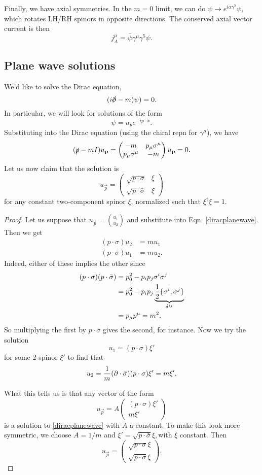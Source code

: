 Finally, we have axial symmetries. In the $m=0$ limit, we can do $\psi \to e^{i\alpha \gamma^5} \psi$, which rotates LH/RH spinors in opposite directions. The conserved axial vector current is then
$$j^\mu_A =\bar \psi \gamma^\mu \gamma^5 \psi.$$

\subsection*{Plane wave solutions} We'd like to solve the Dirac equation,
$$(i\slashed{\p}-m)\psi)=0.$$
In particular, we will look for solutions of the form
$$\psi = u_p e^{-ip\cdot x}.$$
Substituting into the Dirac equation (using the chiral repn for $\gamma^\mu$), we have
\begin{equation}\label{diracplanewave}
(\slashed{p}-m I)u_{\vec p} = \begin{pmatrix} -m & p_\mu \sigma^\mu \\
p_\mu \bar \sigma^\mu & -m
\end{pmatrix} u_{\vec p} =0.
\end{equation}
Let us now claim that the solution is
$$u_{\vec p}=\begin{pmatrix}
    \sqrt{p\cdot \sigma} & \xi\\
    \sqrt{p\cdot \bar \sigma} & \xi
\end{pmatrix}$$
for any constant two-component spinor $\xi$, normalized such that $\xi^\dagger \xi =1$.
\begin{proof}
Let us suppose that $u_{\vec p}={u_1\choose u_2}$ and substitute into Eqn. \ref{diracplanewave}. Then we get
\begin{align}
    (p\cdot \sigma)u_2 &= m u_1\\
    (p\cdot \bar \sigma)u_1 &= m u_2.
\end{align}
Indeed, either of these implies the other since
\begin{align*}
    (p\cdot \sigma)(p\cdot \bar \sigma) &= p_0^2 -p_i p_j \sigma^i \sigma^j\\
    &= p_0^2 -p_i p_j \underbrace{\frac{1}{2}\set{\sigma^i,\sigma^j}}_{\delta^{ij}}\\
    &=p_\mu p^\mu = m^2.
\end{align*}
So multiplying the first by $p\cdot \bar \sigma$ gives the second, for instance. Now we try the solution
$$u_1=(p\cdot \sigma)\xi'$$ for some 2-spinor $\xi'$ to find that
$$u_2=\frac{1}{m}(\p \cdot \bar \sigma)(p\cdot \sigma)\xi' = m\xi'.$$

What this tells us is that any vector of the form
$$u_{\vec p} =A \begin{pmatrix}
(p\cdot \sigma)\xi'\\ m \xi'
\end{pmatrix}$$
is a solution to \ref{diracplanewave} with $A$ a constant. To make this look more symmetric, we choose $A=1/m$ and $\xi'=\sqrt{p\cdot \bar \sigma}\xi,$with $\xi$ constant. Then
$$u_{\vec p}=\begin{pmatrix}\sqrt{p\cdot \sigma}\xi\\
\sqrt{p\cdot \bar \sigma}\xi
\end{pmatrix}.$$
\end{proof}

